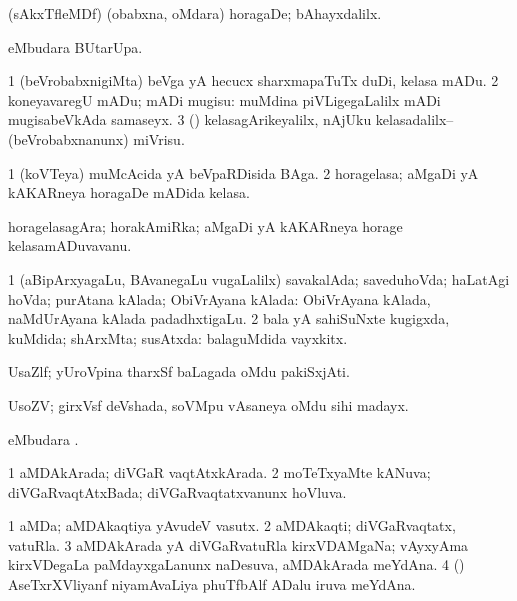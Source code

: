 \bentry
{}
\gl{\upa}
\bmng
(sAkxTfleMDf) (obabxna, oMdara) horagaDe; bAhayxdalilx. 
\emng
\eentry

\bentry
{}
\gl{\kirx}
\bmng
{} eMbudara BUtarUpa. 
\emng
\eentry

\bentry
{}
\gl{\sakirx}
\bmng
\bnum
\num{1} (beVrobabxnigiMta) beVga yA hecucx sharxmapaTuTx duDi, kelasa mADu. 
\num{2} koneyavaregU mADu; mADi mugisu:  muMdina piVLigegaLalilx mADi mugisabeVkAda samaseyx. 
\num{3} (\pArxparx) kelasagArikeyalilx, nAjUku kelasadalilx--(beVrobabxnanunx) miVrisu. 
\enum
\emng
\eentry

\bentry
{}
\gl{\nA}
\bmng
\bnum
\num{1} (koVTeya) muMcAcida yA beVpaRDisida BAga. 
\num{2} horagelasa; aMgaDi yA kAKARneya horagaDe mADida kelasa. 
\enum
\emng
\eentry

\bentry
{}
\gl{\nA}
\bmng
horagelasagAra; horakAmiRka; aMgaDi yA kAKARneya horage kelasamADuvavanu. 
\emng
\eentry

\bentry
{}
\gl{\gu}
\bmng
\bnum
\num{1} (aBipArxyagaLu, BAvanegaLu \mo vugaLalilx) savakalAda; saveduhoVda; haLatAgi hoVda; purAtana kAlada; ObiVrAyana kAlada:  ObiVrAyana kAlada, naMdUrAyana kAlada padadhxtigaLu. 
\num{2} bala yA sahiSuNxte kugigxda, kuMdida; shArxMta; susAtxda:  balaguMdida vayxkitx. 
\enum
\emng
\eentry



\bentry
{}
\gl{\nA}
\bmng
UsaZlf; yUroVpina tharxSf baLagada oMdu pakiSxjAti. 
\emng
\eentry

\bentry
{}
\gl{\nA}
\bmng
UsoZV; girxVsf deVshada, soVMpu vAsaneya oMdu sihi madayx. 
\emng
\eentry

\bentry
{}
\gl{\nA}
\bmng
{} eMbudara \bava. 
\emng
\eentry

\bentry
{}
\gl{\gu}
\bmng
\bnum
\num{1} aMDAkArada; diVGaR vaqtAtxkArada. 
\num{2} moTeTxyaMte kANuva; diVGaRvaqtAtxBada; diVGaRvaqtatxvanunx hoVluva. 
\enum
\emng
\eentry

\bentry
{}
\gl{\nA}
\bmng
\bnum
\num{1} aMDa; aMDAkaqtiya yAvudeV vasutx. 
\num{2} aMDAkaqti; diVGaRvaqtatx, vatuRla. 
\num{3} aMDAkArada yA diVGaRvatuRla kirxVDAMgaNa; vAyxyAma kirxVDegaLa paMdayxgaLanunx naDesuva, aMDAkArada meYdAna. 
\num{4} (\AseTxrXV) AseTxrXVliyanf niyamAvaLiya phuTfbAlf ADalu iruva meYdAna. 
\enum
\emng


